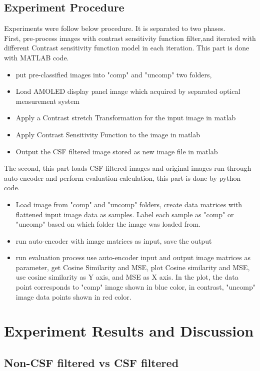 \documentclass{article}
\begin{document}
\subsection{Experiment Procedure}
Experiments were follow below procedure. It is separated to two phases.\\
First, pre-process images with contrast sensitivity function filter,and iterated with different Contrast sensitivity function model in each iteration. This part is done with MATLAB code.
\begin{itemize}
    \item put pre-classified images into "comp" and "uncomp" two folders, 
    \item Load AMOLED display panel image which acquired by separated optical measurement system
    \item Apply a Contrast stretch Transformation for the input image in matlab
    \item Apply Contrast Sensitivity Function to the image in matlab
    \item Output the CSF filtered image stored as new image file in matlab
\end{itemize}
The second, this part loads CSF filtered images and original images run through auto-encoder and perform evaluation calculation, this part is done by python code.
\begin{itemize}
    \item Load image from "comp" and "uncomp" folders, create data matrices with flattened input image data as samples. Label each sample as "comp" or "uncomp" based on which folder the image was loaded from.
    \item run auto-encoder with image matrices as input, save the output
    \item run evaluation process use auto-encoder input and output image matrices as parameter, get Cosine Similarity and MSE, plot Cosine similarity and MSE, use cosine similarity as Y axis, and MSE as X axis. In the plot, the data point corresponds to "comp" image shown in blue color, in contrast, "uncomp" image data points shown in red color.   
\end{itemize}

\section{Experiment Results and Discussion}
\subsection{Non-CSF filtered vs CSF filtered}
\end{document}
